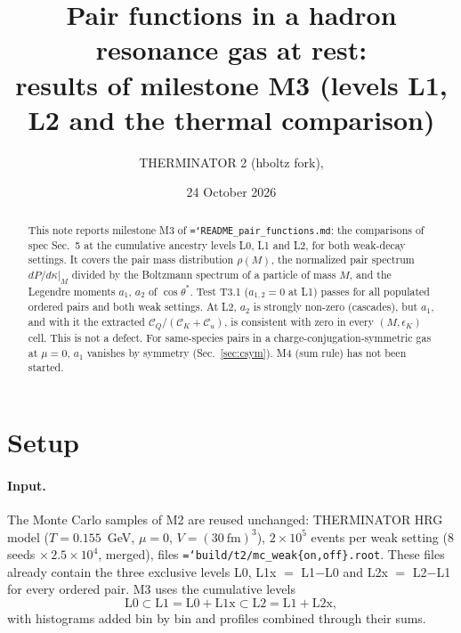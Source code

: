 \documentclass[11pt,a4paper]{article}
\title{Pair functions in a hadron resonance gas at rest:\\ results of milestone M3
(levels L1, L2 and the thermal comparison)}
\author{THERMINATOR 2 (hboltz fork), \code{src/work/README\_pair\_functions.md}}
\date{24 October 2026}
\newcommand{\CK}{\mathcal C_K}
\newcommand{\Cu}{\mathcal C_u}
\newcommand{\CQ}{\mathcal C_Q}
\newcommand{\code}[1]{\texttt{\hyphenchar\font=`\-#1}}
\begin{document}
\maketitle

\begin{abstract}
\noindent
This note reports milestone M3 of \code{README\_pair\_functions.md}: the comparisons of spec Sec.~5
at the cumulative ancestry levels L0, L1 and L2, for both weak-decay settings. It covers the pair mass
distribution $\rho(M)$, the normalized pair spectrum $dP/d\kappa|_M$ divided by the Boltzmann
spectrum of a particle of mass $M$, and the Legendre moments $a_1$, $a_2$ of $\cos\theta^*$.
Test T3.1 ($a_{1,2}=0$ at L1) passes for all populated ordered pairs and both weak settings. At L2,
$a_2$ is strongly non-zero (cascades), but $a_1$, and with it the extracted $\CQ/(\CK+\Cu)$, is
consistent with zero in every $(M,\epsilon_K)$ cell. This is not a defect. For same-species
pairs in a charge-conjugation-symmetric gas at $\mu=0$, $a_1$ vanishes by symmetry
(Sec.~\ref{sec:csym}). M4 (sum rule) has not been started.
\end{abstract}

\section{Setup}

\paragraph{Input.} The Monte Carlo samples of M2 are reused unchanged: THERMINATOR HRG model
($T=0.155$~GeV, $\mu=0$, $V=(30~\text{fm})^3$), $2\times10^5$ events per weak setting (8 seeds
$\times\,2.5\times10^4$, merged), files \code{build/t2/mc\_weak\{on,off\}.root}. These files already
contain the three exclusive levels L0, L1x $=$ L1$-$L0 and L2x $=$ L2$-$L1 for every ordered pair.
M3 uses the cumulative levels
\[
\text{L0}\subset\text{L1}=\text{L0}+\text{L1x}\subset\text{L2}=\text{L1}+\text{L2x},
\]
with histograms added bin by bin and profiles combined through their sums.
\end{document}
